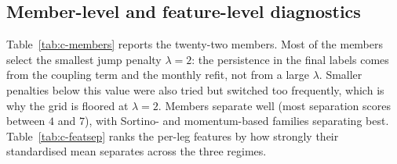 \subsection*{Member-level and feature-level diagnostics}
Table~\ref{tab:c-members} reports the twenty-two members. Most of the members select the smallest
jump penalty $\lambda=2$: the persistence in the final labels comes from the coupling term
and the monthly refit, not from a large $\lambda$. Smaller penalties below this value were also tried but switched too frequently, which is why the grid is floored at $\lambda=2$. Members separate well (most separation
scores between $4$ and $7$), with Sortino- and momentum-based families separating
best. Table~\ref{tab:c-featsep} ranks the per-leg features by how strongly their
standardised mean separates across the three regimes.

